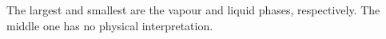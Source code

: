 \documentclass[a4paper,fleqn]{cas-dc}
\begin{document}
The largest and smallest are the vapour and liquid phases, respectively. The middle one has no physical interpretation.

\end{document}
